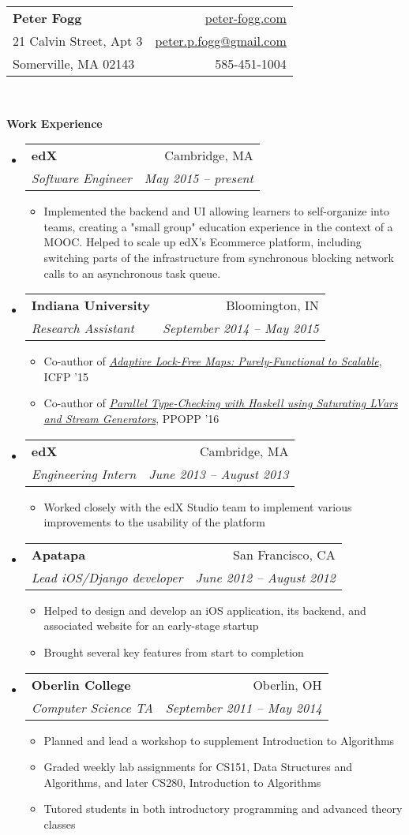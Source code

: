 \documentclass[letterpaper,11pt]{article}
\makeatletter
\newcommand{\resitem}[1]{\item #1 \vspace{-2pt}}
\newcommand{\resheading}[1]{{\large\colorbox{mygrey}{\begin{minipage}{\textwidth}{\textbf{#1\vphantom{p\^{E}}}}\end{minipage}}}}
\newcommand{\ressubheading}[4]{
  \begin{tabular*}{6.5in}{l@{\extracolsep{\fill}}r}
    \textbf{#1} & #2 \\
    \textit{#3} & \textit{#4} \\
  \end{tabular*}\vspace{-6pt}}
\makeatother
\begin{document}
\newcommand{\mywebheader}{
  \begin{tabular*}{7in}{l@{\extracolsep{\fill}}r}
    \textbf{\LARGE Peter Fogg} & \href{http://peter-fogg.com}{peter-fogg.com} \\
    21 Calvin Street, Apt 3 &  \href{mailto:peter.p.fogg@gmail.com}{peter.p.fogg@gmail.com} \\
    Somerville, MA 02143 & 585-451-1004
  \end{tabular*}
  \\
  \vspace{0.1in}}

\mywebheader

\resheading{Work Experience}
\begin{itemize}
\item
  \ressubheading{edX}{Cambridge, MA}{Software Engineer}{May 2015 -- present}
  \begin{itemize}
  \resitem{Implemented the backend and UI allowing learners to self-organize into teams, creating a "small group" education experience in the context of a MOOC. Helped to scale up edX's Ecommerce platform, including switching parts of the infrastructure from synchronous blocking network calls to an asynchronous task queue.}
  \end{itemize}
\item
  \ressubheading{Indiana University}{Bloomington, IN}{Research Assistant}{September 2014 -- May 2015}
  \begin{itemize}
  \resitem{Co-author of \href{http://www.cs.indiana.edu/~rrnewton/papers/icfp15_adaptive_data.pdf}{\textit{Adaptive Lock-Free Maps: Purely-Functional to Scalable}}, ICFP '15}
  \resitem{Co-author of \href{https://dl.acm.org/citation.cfm?id=2851142}{\textit{Parallel Type-Checking with Haskell using Saturating LVars and Stream Generators}}, PPOPP '16}
  \end{itemize}
\item
  \ressubheading{edX}{Cambridge, MA}{Engineering Intern}{June 2013 -- August 2013}
  \begin{itemize}
  \resitem{Worked closely with the edX Studio team to implement various improvements to the usability of the platform}
  \end{itemize}
\item
  \ressubheading{Apatapa}{San Francisco, CA}{Lead iOS/Django developer}{June 2012 -- August 2012}
  \begin{itemize}
    \resitem{Helped to design and develop an iOS application, its backend, and associated website for an early-stage startup}
    \resitem{Brought several key features from start to completion}
  \end{itemize}
\item
  \ressubheading{Oberlin College}{Oberlin, OH}{Computer Science TA}{September 2011 -- May 2014}
  \begin{itemize}
    \resitem{Planned and lead a workshop to supplement Introduction to Algorithms}
    \resitem{Graded weekly lab assignments for CS151, Data Structures and Algorithms, and later CS280, Introduction to Algorithms}
    \resitem{Tutored students in both introductory programming and advanced theory classes}
  \end{itemize}
\end{itemize}
\end{document}
